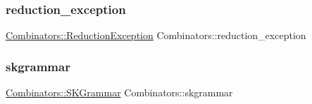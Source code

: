 \subsubsection{\texorpdfstring{reduction\+\_\+exception}{reduction\_exception}}
{\footnotesize\ttfamily  \hyperlink{class_combinators_1_1_reduction_exception}{Combinators\+::\+Reduction\+Exception}  Combinators\+::reduction\+\_\+exception}

\mbox{\label{namespace_combinators_a24aeacfa083d06000a89cb59d14eeccb}} 
\subsubsection{\texorpdfstring{skgrammar}{skgrammar}}
{\footnotesize\ttfamily  \hyperlink{class_combinators_1_1_s_k_grammar}{Combinators\+::\+S\+K\+Grammar}  Combinators\+::skgrammar}

